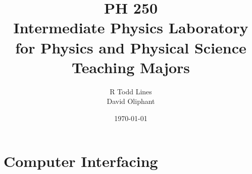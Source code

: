 \documentclass{book}
\begin{document}
\frontmatter
\title{{\Huge PH 250}\\
{\Huge {\Large Intermediate Physics Laboratory for Physics and Physical
Science Teaching Majors} }}
\author{R Todd Lines\\ David Oliphant}

\date{\today}
\maketitle
\tableofcontents






\mainmatter

\part{Computer Interfacing}

		
	
		
	
		
	
		
	
		
\end{document}
